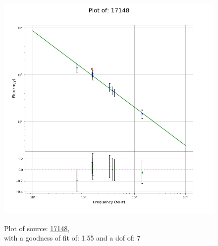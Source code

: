 \documentclass{article}
\begin{document}
\begin{figure}[H]
\begin{minipage}{0.5\textwidth}
        \includegraphics[scale = 0.35]{KmeulenTrap4P23_1min/1min17148.png}
        \captionsetup{labelformat=empty}
        \caption{Plot of source: \href{http://banana.transientskp.org/r4/vlo_KmeulenTrap4P23/runningcatalog/17148}{17148},\\with a goodness of fit of: 1.55 and a dof of: 7}
    \addtocounter{figure}{-1}
    \label{KmeulenTrap4P23:1min:17148:plot}
    \end{minipage}
\end{figure}
\end{document}
